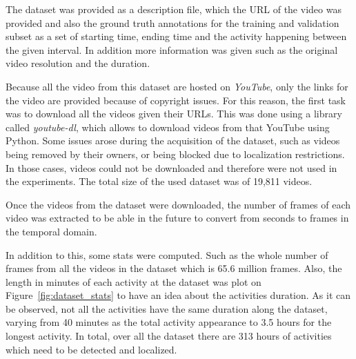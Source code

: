 The dataset was provided as a description file, which the URL of the video was provided and also the ground truth annotations for the training and validation subset as a set of starting time, ending time and the activity happening between the given interval. In addition more information was given such as the original video resolution and the duration.

Because all the video from this dataset are hosted on \textit{YouTube}, only the links for the video are provided because of copyright issues. For this reason, the first task was to download all the videos given their URLs. This was done using a library called \textit{youtube-dl}, which allows to download videos from that YouTube using Python. Some issues arose during the acquisition of the dataset, such as videos being removed by their owners, or being blocked due to localization restrictions. In those cases, videos could not be downloaded and therefore were not used in the experiments. The total size of the used dataset was of 19,811 videos.


Once the videos from the dataset were downloaded, the number of frames of each video was extracted to be able in the future to convert from seconds to frames in the temporal domain. 


In addition to this, some stats were computed. Such as the whole number of frames from all the videos in the dataset which is 65.6 million frames. Also, the length in minutes of each activity at the dataset was plot on Figure~\ref{fig:dataset_stats} to have an idea about the activities duration. As it can be observed, not all the activities have the same duration along the dataset, varying from 40 minutes as the total activity appearance to 3.5 hours for the longest activity. In total, over all the dataset there are 313 hours of activities which need to be detected and localized.

